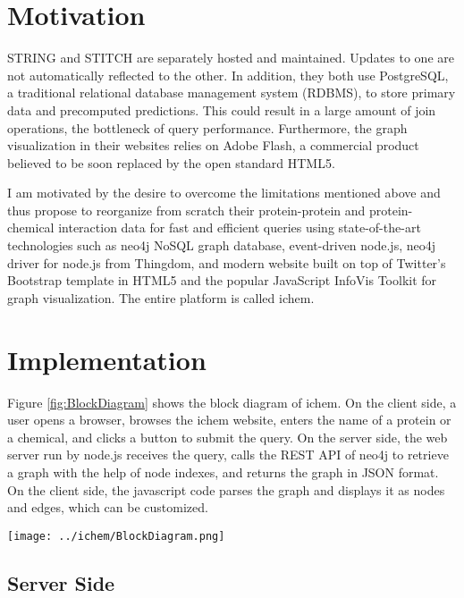 \documentclass[10pt,conference,compsocconf]{IEEEtran}
\begin{document}
\section{Motivation}

STRING and STITCH are separately hosted and maintained. Updates to one are not automatically reflected to the other. In addition, they both use PostgreSQL, a traditional relational database management system (RDBMS), to store primary data and precomputed predictions. This could result in a large amount of join operations, the bottleneck of query performance. Furthermore, the graph visualization in their websites relies on Adobe Flash, a commercial product believed to be soon replaced by the open standard HTML5.

I am motivated by the desire to overcome the limitations mentioned above and thus propose to reorganize from scratch their protein-protein and protein-chemical interaction data for fast and efficient queries using state-of-the-art technologies such as neo4j NoSQL graph database, event-driven node.js, neo4j driver for node.js from Thingdom, and modern website built on top of Twitter's Bootstrap template in HTML5 and the popular JavaScript InfoVis Toolkit for graph visualization. The entire platform is called ichem.

\section{Implementation}

Figure \ref{fig:BlockDiagram} shows the block diagram of ichem. On the client side, a user opens a browser, browses the ichem website, enters the name of a protein or a chemical, and clicks a button to submit the query. On the server side, the web server run by node.js receives the query, calls the REST API of neo4j to retrieve a graph with the help of node indexes, and returns the graph in JSON format. On the client side, the javascript code parses the graph and displays it as nodes and edges, which can be customized.

\begin{figure*}
\centering
\texttt{[image: ../ichem/BlockDiagram.png]}
\caption{ichem block diagram.}
\label{fig:BlockDiagram}
\end{figure*}

\subsection{Server Side}
\end{document}
